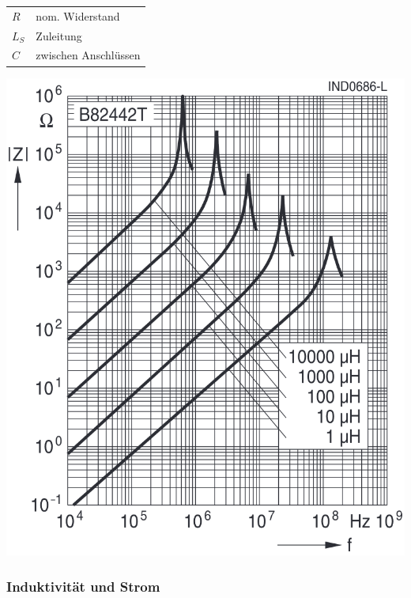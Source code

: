 \begin{minipage}[c]{0.58\columnwidth}
    

    \begin{tabular}{ll}
        $R$     & nom. Widerstand  \\
        $L_S$   & Zuleitung \\
        $C$     & zwischen Anschlüssen \\
    \end{tabular}
\end{minipage}
\hfill
\begin{minipage}[c]{0.4\columnwidth}
    \includegraphics[width=\columnwidth]{images/reale_spule_frequenzverlauf.png}
\end{minipage}


\subsubsection{Induktivität und Strom}

